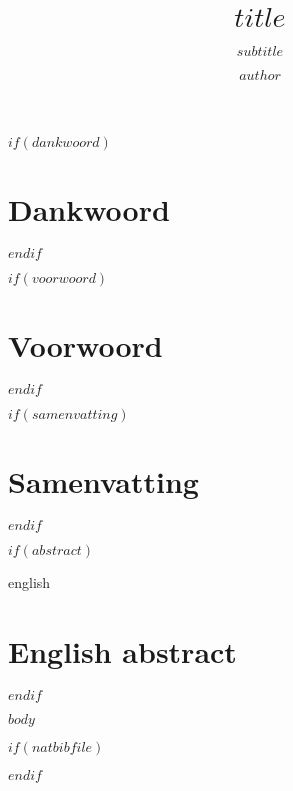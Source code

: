 \documentclass[9pt, twoside]{extreport}
\title{$title$}
\subtitle{$subtitle$}
\author{$author$}
\begin{document}
\maketitle
{}

$if(dankwoord)$
  \chapter*{Dankwoord}
  
$endif$

$if(voorwoord)$
  \chapter*{Voorwoord}
  
$endif$

$if(samenvatting)$
  \chapter*{Samenvatting}
  
$endif$

$if(abstract)$
  \begin{otherlanguage*}{english}
  \chapter*{English abstract}
  
  \end{otherlanguage*}
$endif$

\tableofcontents
{}

\newpage
{}

$body$

$if(natbibfile)$


$endif$
\end{document}
